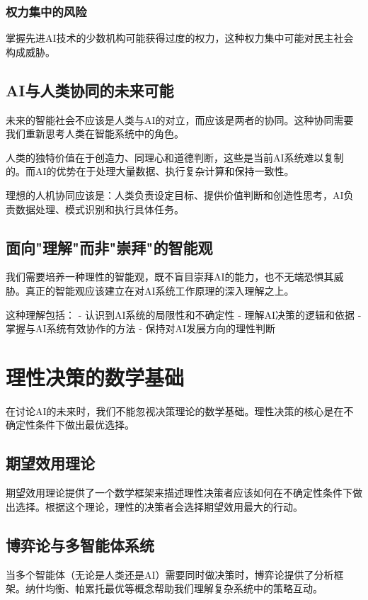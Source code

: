 \subsubsection{权力集中的风险}
掌握先进AI技术的少数机构可能获得过度的权力，这种权力集中可能对民主社会构成威胁。

\subsection{AI与人类协同的未来可能}

未来的智能社会不应该是人类与AI的对立，而应该是两者的协同。这种协同需要我们重新思考人类在智能系统中的角色。

人类的独特价值在于创造力、同理心和道德判断，这些是当前AI系统难以复制的。而AI的优势在于处理大量数据、执行复杂计算和保持一致性。

理想的人机协同应该是：人类负责设定目标、提供价值判断和创造性思考，AI负责数据处理、模式识别和执行具体任务。

\subsection{面向"理解"而非"崇拜"的智能观}

我们需要培养一种理性的智能观，既不盲目崇拜AI的能力，也不无端恐惧其威胁。真正的智能观应该建立在对AI系统工作原理的深入理解之上。

这种理解包括：
- 认识到AI系统的局限性和不确定性
- 理解AI决策的逻辑和依据
- 掌握与AI系统有效协作的方法
- 保持对AI发展方向的理性判断

\section{理性决策的数学基础}

在讨论AI的未来时，我们不能忽视决策理论的数学基础。理性决策的核心是在不确定性条件下做出最优选择。

\subsection{期望效用理论}
期望效用理论提供了一个数学框架来描述理性决策者应该如何在不确定性条件下做出选择。根据这个理论，理性的决策者会选择期望效用最大的行动。

\subsection{博弈论与多智能体系统}
当多个智能体（无论是人类还是AI）需要同时做决策时，博弈论提供了分析框架。纳什均衡、帕累托最优等概念帮助我们理解复杂系统中的策略互动。

